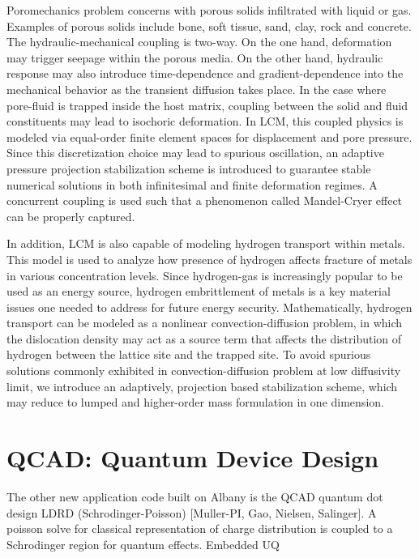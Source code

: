 \documentclass[pdf,12pt,report,strict]{SANDreport}
\theoremstyle{remark}
\begin{document}
Poromechanics problem concerns with porous solids infiltrated with 
liquid or gas. Examples of porous solids include bone, soft tissue, sand, clay, 
rock and concrete. The hydraulic-mechanical coupling is two-way. On the one hand,
 deformation may trigger seepage within the porous media. On the other hand, 
  hydraulic response may also introduce time-dependence and gradient-dependence
   into the mechanical behavior as the transient diffusion takes place.  In the case
    where pore-fluid is trapped inside the host matrix, coupling between the solid and
     fluid constituents may lead to isochoric deformation. In LCM, this coupled physics
      is modeled via equal-order finite element spaces for displacement and pore
       pressure. Since this discretization choice may lead to spurious oscillation, an
        adaptive pressure projection stabilization scheme is introduced to guarantee
         stable numerical solutions in both infinitesimal and finite deformation regimes. 
         A concurrent coupling is used such that a phenomenon called Mandel-Cryer
          effect can be properly captured. 
 
In addition, LCM is also capable of modeling hydrogen transport within metals. This
 model is used to analyze how presence of hydrogen affects fracture of metals in
 various concentration levels. Since hydrogen-gas is increasingly popular to be used as 
 an energy source, hydrogen embrittlement of metals is a key material issues one
needed to address for future energy security. Mathematically, hydrogen transport can
be modeled as a nonlinear convection-diffusion problem, in which the dislocation
density may act as a source term that affects the distribution of hydrogen between
the lattice site and the trapped site. To avoid spurious solutions commonly exhibited
 in convection-diffusion problem at low diffusivity limit, we introduce an adaptively, projection based stabilization scheme,  which may reduce to lumped and higher-order mass formulation in one dimension. 

\section{QCAD: Quantum Device Design}

The other new application code built on Albany is the QCAD quantum dot
design LDRD (Schrodinger-Poisson) [Muller-PI, Gao, Nielsen,
  Salinger]. A poisson solve for classical representation of charge
distribution is coupled to a Schrodinger region for quantum effects.
Embedded UQ
\end{document}
